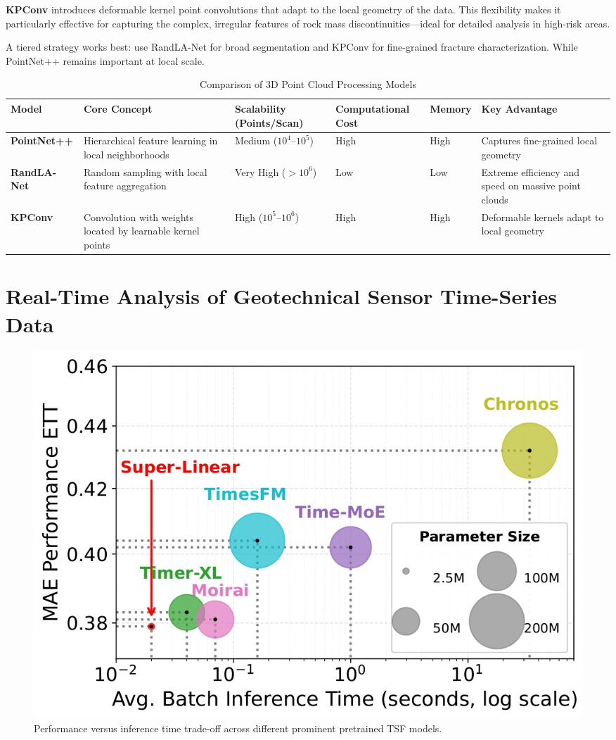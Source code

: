 \documentclass{article}
\begin{document}
\textbf{KPConv} introduces deformable kernel point convolutions that adapt to the local geometry of the data. This flexibility makes it particularly effective for capturing the complex, irregular features of rock mass discontinuities—ideal for detailed analysis in high-risk areas.

A tiered strategy works best: use RandLA-Net for broad segmentation and KPConv for fine-grained fracture characterization. While PointNet++ remains important at local scale.


\begin{table}[h!]
	\centering
	\renewcommand{\arraystretch}{1.3}
	\begin{tabularx}{\textwidth}{@{} l X X X X X @{}}
		\toprule
		\textbf{Model} & \textbf{Core Concept} & \textbf{Scalability (Points/Scan)} & \textbf{Computational Cost} & \textbf{Memory} & \textbf{Key Advantage} \\
		\midrule
		\textbf{PointNet++} & Hierarchical feature learning in local neighborhoods & Medium ($10^4$–$10^5$) & High & High & Captures fine-grained local geometry \\
		\textbf{RandLA-Net} & Random sampling with local feature aggregation & Very High ($>10^6$) & Low & Low & Extreme efficiency and speed on massive point clouds \\
		\textbf{KPConv} & Convolution with weights located by learnable kernel points & High ($10^5$–$10^6$) & High & High & Deformable kernels adapt to local geometry \\
		\bottomrule
	\end{tabularx}
\vspace{2pt}
	\caption{Comparison of 3D Point Cloud Processing Models}
\end{table}

\section{Real-Time Analysis of Geotechnical Sensor Time-Series Data}

\begin{figure}[h!]
	\centering
	\includegraphics[width=0.7\linewidth]{figures/superlinear.jpg}
	\caption{Performance versus inference time trade-off across different prominent pretrained TSF models. \cite{superlinear}}
	\label{fig:fig1}
\end{figure}
\end{document}
